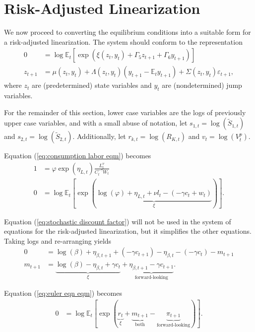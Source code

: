 \documentclass[12 pt, oneside]{article}
\theoremstyle{definition}
\theoremstyle{definition}
\theoremstyle{definition}
\newcommand{\E}{\mathbb{E}}
\newcommand{\fd}{\vspace{2.5mm}}
\begin{document}
\section{Risk-Adjusted Linearization}\label{sec:ral}

We now proceed to converting the equilibrium conditions into a suitable form for a risk-adjusted linearization. The system should conform to the representation
\begin{align*}
  0 & = \log \E_t\left[\exp\left(\xi(z_t, y_t) + \Gamma_5 z_{t + 1} + \Gamma_6 y_{t + 1}\right)\right]\\
  z_{t + 1} & = \mu(z_t, y_t) + \Lambda(z_t, y_t) (y_{t + 1} - \E_t y_{t + 1}) + \Sigma(z_t, y_t) \varepsilon_{t + 1},
\end{align*}
where $z_t$ are (predetermined) state variables and $y_t$ are (nondetermined) jump variables.

For the remainder of this section, lower case variables are the logs of previously upper case variables, and with a small abuse of notation, let $s_{1, t} = \log(\tilde{S}_{1, t})$ and $s_{2, t} = \log(\tilde{S}_{2, t})$. Additionally, let $r_{k, t} = \log(R_{K, t})$ and $v_t = \log(V_t^p)$.

\fd

Equation (\ref{eq:consumption labor eqm}) becomes
\begin{align*}
  1 & = \varphi \exp(\eta_{L, t})\frac{L_t^\nu}{C_t^{-\gamma}W_t}\\
  0 & = \log \E_t\left[\exp\left(\underbrace{\log(\varphi) + \eta_{L, t} + \nu l_t - (- \gamma c_t + w_t)}_{\xi}\right)\right].
\end{align*}

Equation (\ref{eq:stochastic discount factor}) will not be used in the system of equations for the risk-adjusted linearization,
but it simplifies the other equations. Taking logs and re-arranging yields
\begin{align*}
  0 & =  \log(\beta) + \eta_{\beta, t + 1} + (-\gamma c_{t + 1}) - \eta_{\beta, t} - (-\gamma c_t) - m_{t + 1}\\
  m_{t + 1}  & = \underbrace{\log(\beta) -\eta_{\beta, t} + \gamma c_t}_{\xi} + \underbrace{\eta_{\beta, t + 1} - \gamma c_{t + 1}}_{\text{forward-looking}}.
\end{align*}

Equation (\ref{eq:euler eqn eqm}) becomes
\begin{align*}
  0 & = \log\E_t\left[\exp\left(\underbrace{r_t}_{\xi} + \underbrace{m_{t + 1}}_{\text{both}} - \underbrace{\pi_{t + 1}}_{\text{forward-looking}}  \right)\right].
\end{align*}
\end{document}
